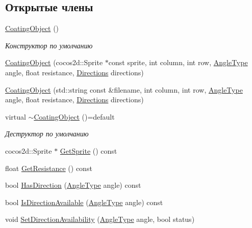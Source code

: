 \subsection*{Открытые члены}
\begin{DoxyCompactItemize}
\item 
\mbox{\label{classrtm_1_1_coating_object_a4b6f326b459b1bbf6b66c08cd74d2f1a}} 
\hyperlink{classrtm_1_1_coating_object_a4b6f326b459b1bbf6b66c08cd74d2f1a}{Coating\+Object} ()
\begin{DoxyCompactList}\small\item\em Конструктор по умолчанию \end{DoxyCompactList}\item 
\hyperlink{classrtm_1_1_coating_object_a4d5d7ecc1ba34ec9f2d29dd39c1c054f}{Coating\+Object} (cocos2d\+::\+Sprite $\ast$const sprite, int column, int row, \hyperlink{namespacertm_a69dc82b16a0148c10962caa83d930f89}{Angle\+Type} angle, float resistance, \hyperlink{namespacertm_a4776fbfe59834ff1a16838ad6735b69a}{Directions} directions)
\item 
\hyperlink{classrtm_1_1_coating_object_ae3cfac6ecad1d4e35a34f80aaf782392}{Coating\+Object} (std\+::string const \&filename, int column, int row, \hyperlink{namespacertm_a69dc82b16a0148c10962caa83d930f89}{Angle\+Type} angle, float resistance, \hyperlink{namespacertm_a4776fbfe59834ff1a16838ad6735b69a}{Directions} directions)
\item 
\mbox{\label{classrtm_1_1_coating_object_aa181401eddb2b9c099c0d56dcbae4d0d}} 
virtual \hyperlink{classrtm_1_1_coating_object_aa181401eddb2b9c099c0d56dcbae4d0d}{$\sim$\+Coating\+Object} ()=default
\begin{DoxyCompactList}\small\item\em Деструктор по умолчанию \end{DoxyCompactList}\item 
cocos2d\+::\+Sprite $\ast$ \hyperlink{classrtm_1_1_coating_object_a5153c2be68353078dac8771cc9c361bb}{Get\+Sprite} () const
\item 
float \hyperlink{classrtm_1_1_coating_object_a1680b004da834a1b885b4e22f09e84cc}{Get\+Resistance} () const
\item 
bool \hyperlink{classrtm_1_1_coating_object_a88eb5287d899ca8e10e31de4192bbddc}{Has\+Direction} (\hyperlink{namespacertm_a69dc82b16a0148c10962caa83d930f89}{Angle\+Type} angle) const
\item 
bool \hyperlink{classrtm_1_1_coating_object_a4d7656260eaa296f1bfa2e957698c437}{Is\+Direction\+Available} (\hyperlink{namespacertm_a69dc82b16a0148c10962caa83d930f89}{Angle\+Type} angle) const
\item 
void \hyperlink{classrtm_1_1_coating_object_a93eb37a24af3939337f6330209fae809}{Set\+Direction\+Availability} (\hyperlink{namespacertm_a69dc82b16a0148c10962caa83d930f89}{Angle\+Type} angle, bool status)
\end{DoxyCompactItemize}
